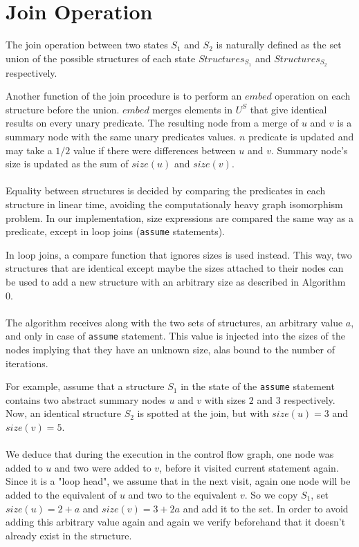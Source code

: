 \section*{Join Operation}
The join operation between two states $S_1$ and $S_2$ is naturally defined as the set union of the possible structures of each state $Structures_{S_1}$ and $Structures_{S_2}$ respectively.

Another function of the join procedure is to perform an $embed$ operation on each structure before the union. $embed$ merges elements in $U^S$ that give identical results on every unary predicate. The resulting node from a merge of $u$ and $v$ is a summary node with the same unary predicates values. $n$ predicate is updated and may take a $1/2$ value if there were differences between $u$ and $v$. Summary node's size is updated as the sum of $size(u)$ and $size(v)$.
\\ \\
Equality between structures is decided by comparing the predicates in each structure in linear time, avoiding the computationaly heavy graph isomorphism problem. In our implementation, size expressions are compared the same way as a predicate, except in loop joins (\texttt{assume} statements).

In loop joins, a compare function that ignores sizes is used instead. This way, two structures that are identical except maybe the sizes attached to their nodes can be used to add a new structure with an arbitrary size as described in Algorithm 0.
\\ \\
The algorithm receives along with the two sets of structures, an arbitrary value $a$, and only in case of \texttt{assume} statement. This value is injected into the sizes of the nodes implying that they have an unknown size, alas bound to the number of iterations.

For example, assume that a structure $S_1$ in the state of the \texttt{assume} statement contains two abstract summary nodes $u$ and $v$ with sizes $2$ and $3$ respectively. Now, an identical structure $S_2$ is spotted at the join, but with $size(u)=3$ and $size(v)=5$.
\\ \\
We deduce that during the execution in the control flow graph, one node was added to $u$ and two were added to $v$, before it visited current statement again. Since it is a "loop head", we assume that in the next visit, again one node will be added to the equivalent of $u$ and two to the equivalent $v$. So we copy $S_1$, set $size(u)=2+a$ and $size(v)=3+2a$ and add it to the set. In order to avoid adding this arbitrary value again and again we verify beforehand that it doesn't already exist in the structure.

